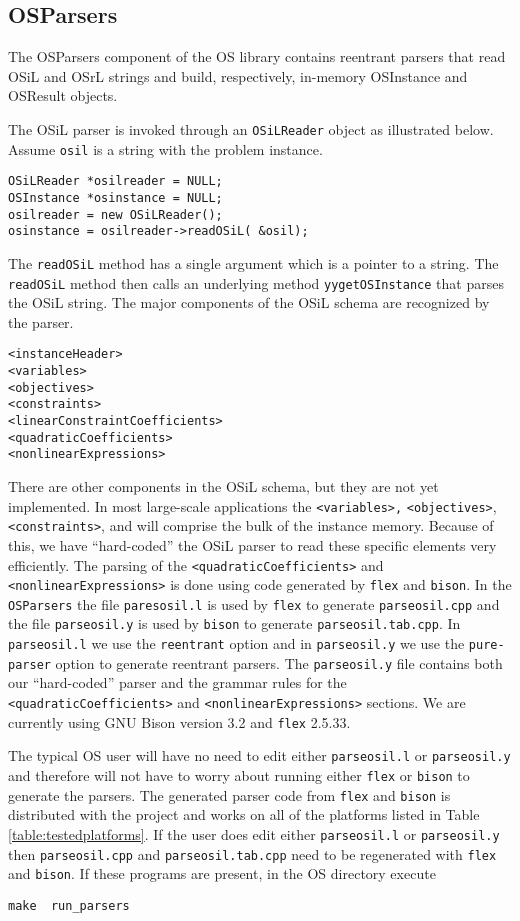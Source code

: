 \documentclass[11pt]{article}
\renewcommand{\_}{{\char"5F}}
\renewcommand{\{}{{\char"7B}}
\renewcommand{\}}{{\char"7D}}
\renewcommand{\^}{{\char"0D}}
\renewcommand{\'}{{\char"0D}}
\begin{document}
\subsection{OSParsers}

The OSParsers component of the OS library contains reentrant parsers that  read OSiL and OSrL strings and build, respectively, in-memory OSInstance and OSResult  objects.


The OSiL parser is invoked through an {\tt OSiLReader} object as illustrated below. Assume {\tt osil} is a string with the problem instance.
\begin{verbatim}
OSiLReader *osilreader = NULL;
OSInstance *osinstance = NULL;
osilreader = new OSiLReader();
osinstance = osilreader->readOSiL( &osil);
\end{verbatim}
The {\tt  readOSiL} method  has a single argument which is a pointer to a string. The {\tt  readOSiL} method then calls an underlying method {\tt yygetOSInstance} that parses the OSiL string. The major components of the OSiL schema are recognized by the parser.
\begin{verbatim}
<instanceHeader>
<variables>
<objectives>
<constraints>
<linearConstraintCoefficients>
<quadraticCoefficients>
<nonlinearExpressions>
\end{verbatim}
There are other components in the OSiL schema, but they are not yet implemented. In most large-scale applications the {\tt <variables>,} {\tt <objectives>}, {\tt <constraints>}, and {\tt }  will comprise the bulk of the instance memory.  Because of this, we have ``hard-coded'' the OSiL parser to read these specific elements very efficiently. The parsing of the {\tt <quadraticCoefficients>} and {\tt <nonlinearExpressions>} is done using code generated by {\tt flex} and {\tt bison}. In the {\tt OSParsers}  the file  {\tt paresosil.l} is used by {\tt flex} to generate {\tt parseosil.cpp} and the file {\tt parseosil.y} is used by {\tt bison} to generate {\tt parseosil.tab.cpp}.  In {\tt parseosil.l} we use the {\tt reentrant} option and in {\tt parseosil.y} we use the {\tt pure-parser} option to generate reentrant parsers. The {\tt parseosil.y} file  contains both our  ``hard-coded'' parser and the grammar rules for the  {\tt <quadraticCoefficients>} and {\tt <nonlinearExpressions>} sections.   We are currently using GNU Bison version 3.2 and {\tt flex} 2.5.33.

The typical OS user will have no need to edit either {\tt parseosil.l} or {\tt parseosil.y} and therefore will not have to worry about running either {\tt flex} or {\tt bison} to generate the parsers. The generated parser code from {\tt flex} and {\tt bison} is distributed with the project and works on all of the platforms listed in Table \ref{table:testedplatforms}.  If the user does edit either {\tt parseosil.l} or {\tt parseosil.y} then {\tt parseosil.cpp} and {\tt parseosil.tab.cpp} need to be regenerated with {\tt flex} and {\tt bison}. If these programs are present, in the OS directory  execute
\begin{verbatim}
make  run_parsers
\end{verbatim}
\end{document}
